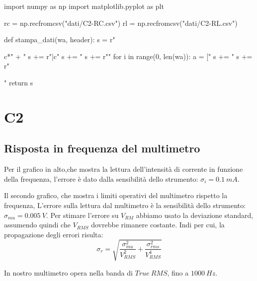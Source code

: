 \begin{sagesilent}
import numpy as np
import matplotlib.pyplot as plt

rc = np.recfromcsv("dati/C2-RC.csv")
rl = np.recfromcsv("dati/C2-RL.csv")



def stampa_dati(wa, header):
  s = r"\begin{tabular}{c*{" + "%
  s += r"}{|c}}"
  s += "%
  s += r"\midrule"
  for i in range(0, len(wa)):
    a = ["%
    s += "%
  s += r"\end{tabular}"
  return s
  
  

\end{sagesilent}



\chapter{C2}


\section{Risposta in frequenza del multimetro}



\begin{center}
\end{center}

Per il grafico in alto,che mostra la lettura dell'intensità di corrente in funzione della frequenza, l'errore è dato dalla sensibilità dello strumento: $\sigma_i = 0.1\ mA$.
\

Il secondo grafico, che mostra i limiti operativi del multimetro rispetto la frequenza, L'errore sulla lettura dal multimetro è la sensibilità dello strumento: $\sigma_{mu} = 0.005\ V$. Per stimare l'errore su $V_{RM}$ abbiamo usato la deviazione standard, assumendo quindi che $V_{RMS}$ dovrebbe rimanere costante. 
Indi per cui, la propagazione degli errori risulta:
$$\sigma_r = \sqrt{\frac{\sigma_{mu}^2}{V_{RMS}^2} + \frac{\sigma_{rms}^2}{V_{RMS}^4}}$$


In nostro multimetro opera nella banda di $True\ RMS$, fino a  $1000\ Hz$.   

